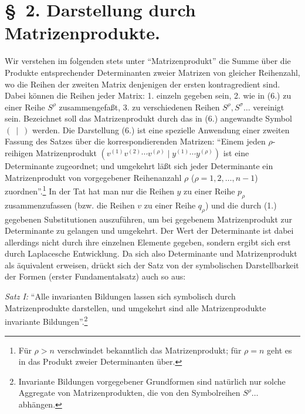 \section*{\S\ 2. Darstellung durch Matrizenprodukte.}
Wir verstehen im folgenden stets unter ``Matrizenprodukt'' die Summe über die Produkte entsprechender Determinanten zweier Matrizen von gleicher Reihenzahl, wo die Reihen der zweiten Matrix denjenigen der ersten kontragredient sind. Dabei können die Reihen jeder Matrix: 1. einzeln gegeben sein, 2. wie in (6.) zu einer Reihe $S^\rho$ zusammengefaßt, 3. zu verschiedenen Reihen $S^\rho,S^\sigma\ldots$ vereinigt sein. Bezeichnet soll das Matrizenprodukt durch das in (6.) angewandte Symbol $(\ \mid\ )$ werden. Die Darstellung (6.) ist eine spezielle Anwendung einer zweiten Fassung des Satzes über die korrespondierenden Matrizen: ``Einem jeden $\rho$-reihigen Matrizenprodukt $(v^{(1)}v^{(2)}\cdots v^{(\rho)}\mid y^{(1)}\cdots y^{(\rho)})$ ist eine Determinante zugeordnet; und umgekehrt läßt sich jeder Determinante ein Matrizenprodukt von vorgegebener Reihenanzahl $\rho$ ($\rho=1,2,\ldots,n-1$) zuordnen''.\footnote{Für $\rho>n$ verschwindet bekanntlich das Matrizenprodukt; für $\rho=n$ geht es in das Produkt zweier Determinanten über.} In der Tat hat man nur die Reihen $y$ zu einer Reihe $p_\rho$ zusammenzufassen (bzw. die Reihen $v$ zu einer Reihe $q_\rho$) und die durch (1.) gegebenen Substitutionen auszuführen, um bei gegebenem Matrizenprodukt zur Determinante zu gelangen und umgekehrt. Der Wert der Determinante ist dabei allerdings nicht durch ihre einzelnen Elemente gegeben, sondern ergibt sich erst durch Laplacesche Entwicklung. Da sich also Determinante und Matrizenprodukt als äquivalent erweisen, drückt sich der Satz von der symbolischen Darstellbarkeit der Formen (erster Fundamentalsatz) auch so aus:

\emph{Satz I:} ``Alle invarianten Bildungen lassen sich symbolisch durch Matrizenprodukte darstellen, und umgekehrt sind alle Matrizenprodukte invariante Bildungen''.\footnote{Invariante Bildungen vorgegebener Grundformen sind natürlich nur solche Aggregate von Matrizenprodukten, die von den Symbolreihen $S^\rho\ldots$ abhängen.}

